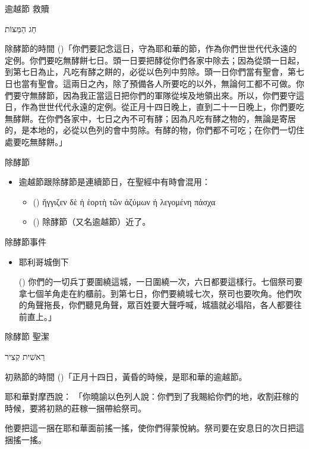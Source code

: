 \documentclass{beamer}
\newcommand{\topic}[1]{
  \begin{frame}
    \centering
    \vspace*{1cm}
    {\fontsize{40}{48}\selectfont #1\par}
    \vfill
  \end{frame}
}
\newcommand{\conclusion}[2]{
  \begin{frame}
    \centering
    \vspace*{1cm}
    {\fontsize{40}{48}\selectfont #1 \textemdash #2\par}
    \vfill
  \end{frame}
}
\newcommand{\parvspace}{\par\vspace{0.5em}}
\begin{document}
\conclusion{逾越節}{救贖}

\topic{\texthebrew{חַג הַמַּצּוֹת}}

\begin{frame}{除酵節的時間}
  ()「你們要記念這日，守為耶和華的節，作為你們世世代代永遠的定例。\alert{你們要吃無酵餅七日。頭一日要把酵從你們各家中除去}；因為從頭一日起，到第七日為止，凡吃有酵之餅的，必從以色列中剪除。\alert{頭一日你們當有聖會，第七日也當有聖會}。這兩日之內，除了預備各人所要吃的以外，無論何工都不可做。\alert{你們要守無酵節，因為我正當這日把你們的軍隊從埃及地領出來}。所以，你們要守這日，作為世世代代永遠的定例。從\alert{正月十四日晚上，直到二十一日晚上}，你們要吃無酵餅。在你們各家中，七日之內不可有酵；因為凡吃有酵之物的，無論是寄居的，是本地的，必從以色列的會中剪除。有酵的物，你們都不可吃；在你們一切住處要吃無酵餅。」\parvspace
\end{frame}

\begin{frame}{除酵節}
  \begin{itemize}
    \item 逾越節跟除酵節是連續節日，在聖經中有時會混用：
      \begin{itemize}
        \item () \textgreek{ἤγγιζεν δὲ ἡ \alert{ἑορτὴ τῶν ἀζύμων} ἡ λεγομένη \alert{πάσχα}}\
        \item () 除酵節（又名逾越節）近了。
      \end{itemize}
  \end{itemize}
\end{frame}

\begin{frame}{除酵節事件}
  \begin{itemize}
    \item 耶利哥城倒下\par
      () 你們的一切兵丁要圍繞這城，一日圍繞一次，六日都要這樣行。七個祭司要拿七個羊角走在約櫃前。到第七日，你們要繞城七次，祭司也要吹角。他們吹的角聲拖長，你們聽見角聲，眾百姓要大聲呼喊，城牆就必塌陷，各人都要往前直上。」
  \end{itemize}
\end{frame}

\conclusion{除酵節}{聖潔}

\topic{\texthebrew{רֵאשִׁית קְצִיר}}

\begin{frame}{初熟節的時間}
  ()「正月十四日，黃昏的時候，是耶和華的逾越節。\textellipsis{}\parvspace
  耶和華對摩西說： 「你曉諭以色列人說：你們到了我賜給你們的地，收割莊稼的時候，要將初熟的莊稼一捆帶給祭司。\parvspace
  他要把這一捆在耶和華面前搖一搖，使你們得蒙悅納。祭司要在\alert{安息日的次日}把這捆搖一搖。\parvspace
\end{frame}
\end{document}
